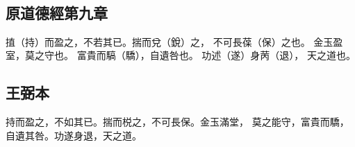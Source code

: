 ﻿%
%

\chapter{~}

\section{原道德經第九章}

\begin{withgezhu}

\zhsong


㨁（\textcolor{tongjia-color}{持}）而盈之，不\colorbox{adding-color}{若其已。揣而}兌（\textcolor{tongjia-color}{銳}）之，
\colorbox{adding-color}{不}可長葆（\textcolor{tongjia-color}{保}）之也。
金玉\colorbox{missing-color}{盈}室，莫之守也。
富貴而䮦（\textcolor{tongjia-color}{驕}），自遺咎也。
功述（\textcolor{tongjia-color}{遂}）身苪（\textcolor{tongjia-color}{退}），
天\colorbox{adding-color}{之道也}。

\end{withgezhu}

\section{王弼本}

\begin{withgezhu}

\zhsong

持而盈之，不如其已。揣而棁之，不可長保。金玉滿堂，
莫之能守，富貴而驕，自遺其咎。功遂身退，天之道。

\end{withgezhu}
